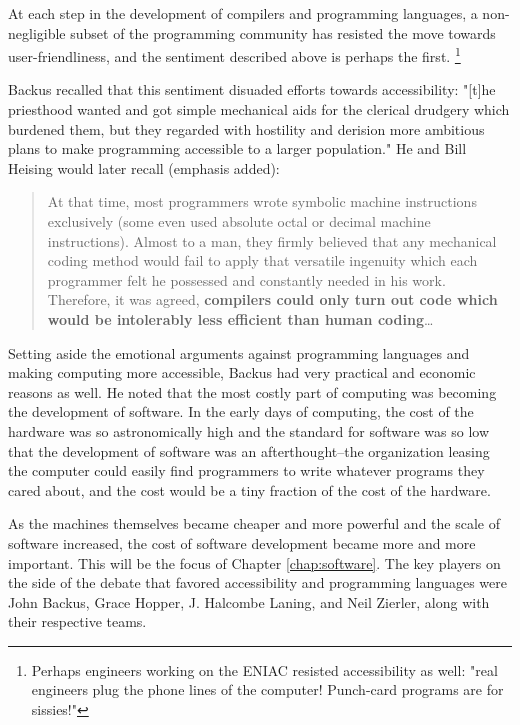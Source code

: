 At each step in the development of compilers and programming languages,
a non-negligible subset of the programming community has resisted the move
towards user-friendliness, and the sentiment \citeauthor{brown_carr_automatic_onr_symposium_1954}
described above is perhaps the first.
\footnote{
	Perhaps engineers working on the ENIAC resisted accessibility as well:
	"real engineers plug the phone lines of the computer! Punch-card programs are for sissies!"
}

Backus recalled that this sentiment disuaded efforts towards accessibility:
"[t]he priesthood wanted and got simple mechanical aids for the clerical
drudgery which burdened them, but they regarded with hostility and derision
more ambitious plans to make programming accessible to a larger population."
He and Bill Heising would later recall (emphasis added):

\begin{quotation}
	At that time, most programmers wrote symbolic machine instructions exclusively
	(some even used absolute octal or decimal machine instructions).
	Almost to a man, they firmly believed that any mechanical coding method
	would fail to apply that versatile ingenuity which each programmer felt he
	possessed and constantly needed in his work.
	Therefore, it was agreed, \textbf{compilers could only turn out code which would be
		intolerably less efficient than human coding}\dots
\end{quotation}

Setting aside the emotional arguments against programming languages and making
computing more accessible, Backus had very practical and economic reasons as well.
He noted that the most costly part of computing was becoming the development of
software. In the early days of computing, the cost of the hardware was so
astronomically high and the standard for software was so low that the development of software
was an afterthought--the organization leasing the computer could easily find
programmers to write whatever programs they cared about, and the cost would be
a tiny fraction of the cost of the hardware.

As the machines themselves became cheaper and more powerful and the scale of software
increased, the cost of software development became more and more important.
This will be the focus of Chapter \ref{chap:software}.
The key players on the side of the debate that favored accessibility and
programming languages were John Backus, Grace Hopper, J. Halcombe Laning,
and Neil Zierler, along with their respective teams.


